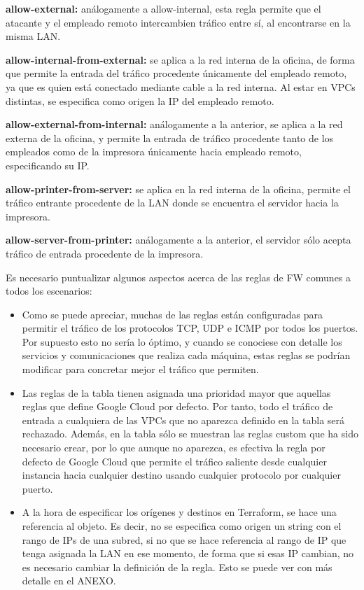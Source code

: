   \textbf{allow-external:} análogamente a allow-internal, esta regla permite que el atacante y el empleado remoto intercambien tráfico entre sí, al encontrarse en la misma LAN.

  \textbf{allow-internal-from-external:} se aplica a la red interna de la oficina, de forma que permite la entrada del tráfico procedente únicamente del empleado remoto, ya que es quien está conectado mediante cable a la red interna. Al estar en VPCs distintas, se especifica como origen la IP del empleado remoto. 

  \textbf{allow-external-from-internal:} análogamente a la anterior, se aplica a la red externa de la oficina, y permite la entrada de tráfico procedente tanto de los empleados como de la impresora únicamente hacia empleado remoto, especificando su IP. 

  \textbf{allow-printer-from-server:} se aplica en la red interna de la oficina, permite el tráfico entrante procedente de la LAN donde se encuentra el servidor hacia la impresora.

  \textbf{allow-server-from-printer:} análogamente a la anterior, el servidor sólo acepta tráfico de entrada procedente de la impresora.

  Es necesario puntualizar algunos aspectos acerca de las reglas de FW comunes a todos los escenarios:

  \begin{itemize}
    \item Como se puede apreciar, muchas de las reglas están configuradas para permitir el tráfico de los protocolos TCP, UDP e ICMP por todos los puertos. Por supuesto esto no sería lo óptimo, y cuando se conociese con detalle los servicios y comunicaciones que realiza cada máquina, estas reglas se podrían modificar para  concretar mejor el tráfico que permiten. 

    \item Las reglas de la tabla tienen asignada una prioridad mayor que aquellas reglas que define Google Cloud por defecto. Por tanto, todo el tráfico de entrada a cualquiera de las VPCs que no aparezca definido en la tabla será rechazado. Además, en la tabla sólo se muestran las reglas custom que ha sido necesario crear, por lo que aunque no aparezca, es efectiva la regla por defecto de Google Cloud que permite el tráfico saliente desde cualquier instancia hacia cualquier destino usando cualquier protocolo por cualquier puerto.

    \item A la hora de especificar los orígenes y destinos en Terraform, se hace una referencia al objeto. Es decir, no se especifica como origen un string con el rango de IPs de una subred, si no que se hace referencia al rango de IP que tenga asignada la LAN en ese momento, de forma que si esas IP cambian, no es necesario cambiar la definición de la regla. Esto se puede ver con más detalle en el ANEXO.
  \end{itemize}

